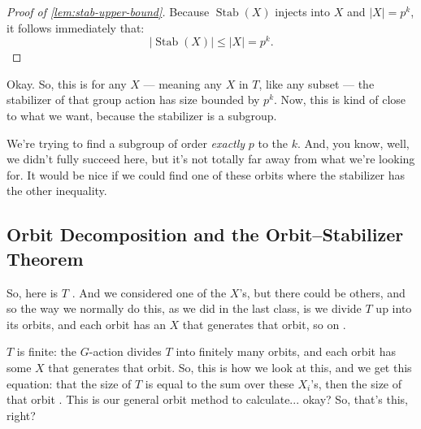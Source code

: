 \begin{proofWrapper}
\begin{content}
\begin{proof}[Proof of \cref{lem:stab-upper-bound}]
Because $\operatorname{Stab}(X)$ injects into $X$ and $|X| = p^k$, it follows immediately that:
\[
|\operatorname{Stab}(X)| \le |X| = p^k.
\]
\end{proof}
\end{content}

\begin{speech}[00:11:18 - 00:11:55]
Okay. So, this is for any $X$ --- meaning any $X$ in $T$, like any subset --- the stabilizer of that group action has size bounded by $p^k$. Now, this is kind of close to what we want, because the stabilizer is a subgroup.

We're trying to find a subgroup of order \emph{exactly} $p$ to the $k$. And, you know, well, we didn't fully succeed here, but it's not totally far away from what we're looking for. It would be nice if we could find one of these orbits where the stabilizer has the other inequality. 
\end{speech}

\begin{hidden}
\end{hidden}

\subsection{Orbit Decomposition and the Orbit--Stabilizer Theorem}

\begin{speech}[00:11:55 - 00:12:49]
So, here is $T$ . And we considered one of the $X$'s, but there could be others, and so the way we normally do this, as we did in the last class, is we divide $T$ up into its orbits, and each orbit has an $X$ that generates that orbit, so on .

$T$ is finite: the $G$-action divides $T$ into finitely many orbits, and each orbit has some $X$ that generates that orbit. So, this is how we look at this, and we get this equation: that the size of $T$ is equal to the sum over these $X_i$'s, then the size of that orbit . This is our general orbit method to calculate... okay? So, that's this, right?
\end{speech}


\end{proofWrapper}
